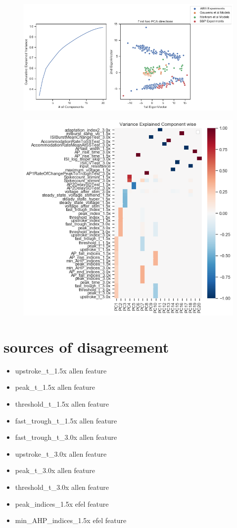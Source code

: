 \begin{figure}    
\begin{center}

\includegraphics[width=0.7\linewidth]{figures/cortical_model_data_agreement_52_1.png}
\end{center}
\end{figure}    
\begin{figure}    
\begin{center}
\includegraphics[width=0.7\linewidth]{figures/cortical_model_data_agreement_54_1.png}
\end{center}
\end{figure}    

\section{sources of disagreement}
\begin{itemize}
    \item upstroke\_t\_1.5x allen feature
    \item  peak\_t\_1.5x allen feature
    \item threshold\_t\_1.5x allen feature
    \item fast\_trough\_t\_1.5x allen feature
    \item fast\_trough\_t\_3.0x allen feature
    \item upstroke\_t\_3.0x allen feature
    \item peak\_t\_3.0x allen feature
    \item threshold\_t\_3.0x allen feature
    \item peak\_indices\_1.5x efel feature
    \item min\_AHP\_indices\_1.5x efel feature
\end{itemize}



